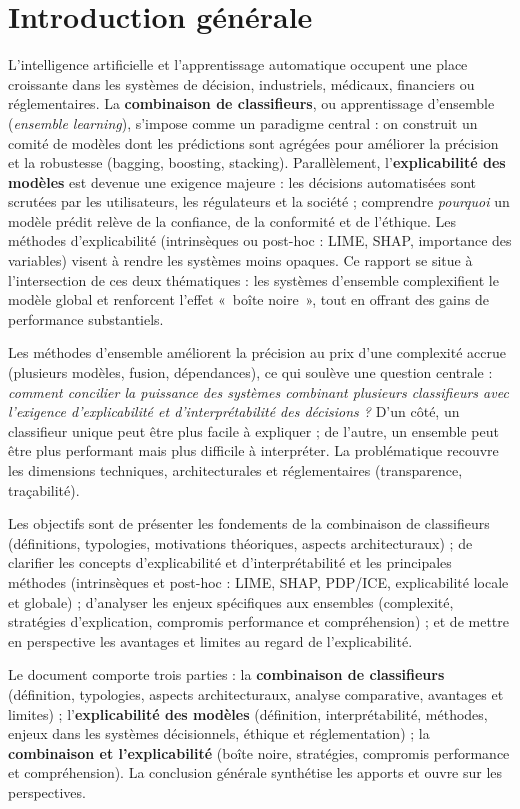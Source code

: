 \section{Introduction générale}

L'intelligence artificielle et l'apprentissage automatique occupent une place croissante dans les systèmes de décision, industriels, médicaux, financiers ou réglementaires. La \textbf{combinaison de classifieurs}, ou apprentissage d'ensemble (\emph{ensemble learning}), s'impose comme un paradigme central : on construit un comité de modèles dont les prédictions sont agrégées pour améliorer la précision et la robustesse (bagging, boosting, stacking). Parallèlement, l'\textbf{explicabilité des modèles} est devenue une exigence majeure : les décisions automatisées sont scrutées par les utilisateurs, les régulateurs et la société ; comprendre \emph{pourquoi} un modèle prédit relève de la confiance, de la conformité et de l'éthique. Les méthodes d'explicabilité (intrinsèques ou post-hoc : LIME, SHAP, importance des variables) visent à rendre les systèmes moins opaques. Ce rapport se situe à l'intersection de ces deux thématiques : les systèmes d'ensemble complexifient le modèle global et renforcent l'effet «~boîte noire~», tout en offrant des gains de performance substantiels.

Les méthodes d'ensemble améliorent la précision au prix d'une complexité accrue (plusieurs modèles, fusion, dépendances), ce qui soulève une question centrale : \textit{comment concilier la puissance des systèmes combinant plusieurs classifieurs avec l'exigence d'explicabilité et d'interprétabilité des décisions ?} D'un côté, un classifieur unique peut être plus facile à expliquer ; de l'autre, un ensemble peut être plus performant mais plus difficile à interpréter. La problématique recouvre les dimensions techniques, architecturales et réglementaires (transparence, traçabilité).

Les objectifs sont de présenter les fondements de la combinaison de classifieurs (définitions, typologies, motivations théoriques, aspects architecturaux) ; de clarifier les concepts d'explicabilité et d'interprétabilité et les principales méthodes (intrinsèques et post-hoc : LIME, SHAP, PDP/ICE, explicabilité locale et globale) ; d'analyser les enjeux spécifiques aux ensembles (complexité, stratégies d'explication, compromis performance et compréhension) ; et de mettre en perspective les avantages et limites au regard de l'explicabilité.

Le document comporte trois parties : la \textbf{combinaison de classifieurs} (définition, typologies, aspects architecturaux, analyse comparative, avantages et limites) ; l'\textbf{explicabilité des modèles} (définition, interprétabilité, méthodes, enjeux dans les systèmes décisionnels, éthique et réglementation) ; la \textbf{combinaison et l'explicabilité} (boîte noire, stratégies, compromis performance et compréhension). La conclusion générale synthétise les apports et ouvre sur les perspectives.
